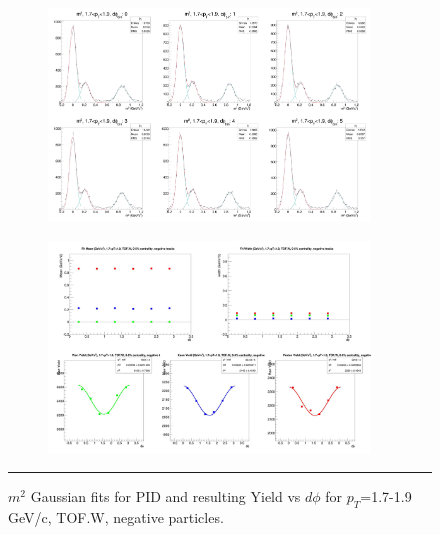 \begin{figure}[H]
  \centering
    \begin{subfigure}[p]{1\textwidth}
   \centering
   \includegraphics[width=0.94\textwidth]{lowptfits/yieldvsdphi_tof1_cent0_ch0_pT-17-19.jpg}
    \end{subfigure}
    \begin{subfigure}[p]{1\textwidth}
   \centering
   \includegraphics[width=0.94\textwidth]{lowptfits/fitParams_tof1_cent0_ch0_pT-17-19.jpg}
    \end{subfigure}
    \rule{35em}{0.5pt}
  \caption[PID fits and Yield vs $d\phi$ for $p_T$=1.7-1.9 GeV/c, TOF.W, negative particles. ]{$m^2$ Gaussian fits for PID and resulting Yield vs $d\phi$ for $p_T$=1.7-1.9 GeV/c, TOF.W, negative particles.}
  \label{fig:fits17-19neg}
\end{figure}

